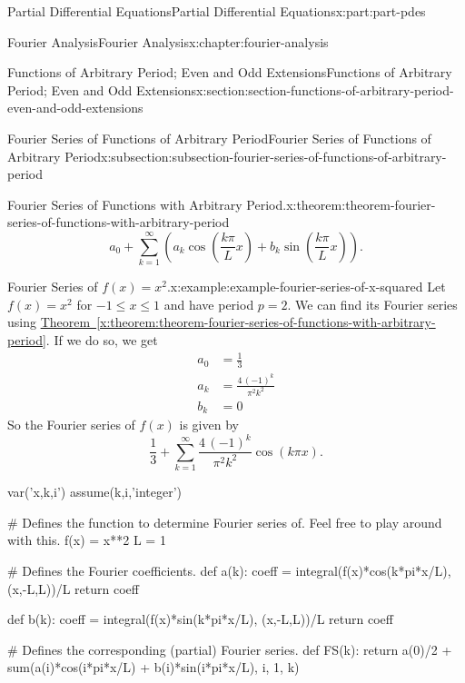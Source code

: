 \documentclass[oneside,10pt,]{book}
\newcommand{\xreffont}{\relax}
\numberwithin{equation}{part}
\newcommand{\amp}{&}
\begin{document}
\begin{partptx}{Partial Differential Equations}{}{Partial Differential Equations}{}{}{x:part:part-pdes}
\begin{chapterptx}{Fourier Analysis}{}{Fourier Analysis}{}{}{x:chapter:fourier-analysis}
\begin{sectionptx}{Functions of Arbitrary Period; Even and Odd Extensions}{}{Functions of Arbitrary Period; Even and Odd Extensions}{}{}{x:section:section-functions-of-arbitrary-period-even-and-odd-extensions}
\begin{subsectionptx}{Fourier Series of Functions of Arbitrary Period}{}{Fourier Series of Functions of Arbitrary Period}{}{}{x:subsection:subsection-fourier-series-of-functions-of-arbitrary-period}
\begin{theorem}{Fourier Series of Functions with Arbitrary Period.}{}{x:theorem:theorem-fourier-series-of-functions-with-arbitrary-period}
\begin{equation*}
a_{0}+\sum_{k=1}^{\infty}\left(a_{k}\cos\left(\frac{k\pi}{L}x\right)+b_{k}\sin\left(\frac{k\pi}{L}x\right)\right).
\end{equation*}
%
\end{theorem}
\begin{example}{Fourier Series of \(f(x) = x^{2}\).}{x:example:example-fourier-series-of-x-squared}%
Let \(f(x) = x^{2}\) for \(-1\leq x\leq 1\) and have period \(p=2\). We can find its Fourier series using \hyperref[x:theorem:theorem-fourier-series-of-functions-with-arbitrary-period]{Theorem~{\xreffont\ref{x:theorem:theorem-fourier-series-of-functions-with-arbitrary-period}}}. If we do so, we get%
\begin{align*}
a_{0} \amp= \frac{1}{3}\\
a_{k} \amp= \frac{4 \, \left(-1\right)^{k}}{\pi^{2} k^{2}}\\
b_{k} \amp= 0
\end{align*}
So the Fourier series of \(f(x)\) is given by%
\begin{equation*}
\frac{1}{3} + \sum_{k=1}^{\infty}\frac{4 \, \left(-1\right)^{k}}{\pi^{2} k^{2}}\cos\left(k\pi x\right)\text{.}
\end{equation*}
%
\end{example}
\begin{sageinput}
var('x,k,i')
assume(k,i,'integer')

# Defines the function to determine Fourier series of. Feel free to play around with this.
f(x) = x**2
L = 1

# Defines the Fourier coefficients.
def a(k):
  coeff = integral(f(x)*cos(k*pi*x/L), (x,-L,L))/L
  return coeff

def b(k):
  coeff = integral(f(x)*sin(k*pi*x/L), (x,-L,L))/L
  return coeff

# Defines the corresponding (partial) Fourier series.
def FS(k):
  return a(0)/2 + sum(a(i)*cos(i*pi*x/L) + b(i)*sin(i*pi*x/L), i, 1, k)


\end{sageinput}
\end{subsectionptx}
\end{sectionptx}
\end{chapterptx}
\end{partptx}
\end{document}
